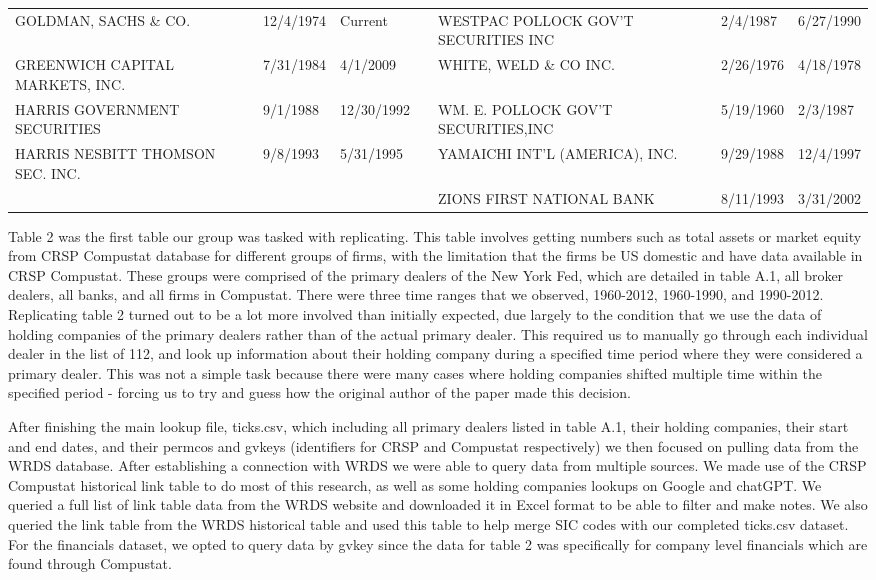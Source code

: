 \documentclass{article}
\begin{document}
\begin{tabular}{lllllll}
GOLDMAN, SACHS \& CO.                & 12/4/1974 & Current &  & WESTPAC POLLOCK GOV'T SECURITIES INC & 2/4/1987 & 6/27/1990 \\
GREENWICH CAPITAL MARKETS, INC.      & 7/31/1984 & 4/1/2009 &  & WHITE, WELD \& CO INC.                & 2/26/1976 & 4/18/1978 \\
HARRIS GOVERNMENT SECURITIES        & 9/1/1988 & 12/30/1992 &  & WM. E. POLLOCK GOV'T SECURITIES,INC  & 5/19/1960 & 2/3/1987 \\
HARRIS NESBITT THOMSON SEC. INC.    & 9/8/1993 & 5/31/1995 &  & YAMAICHI INT'L (AMERICA), INC.      & 9/29/1988 & 12/4/1997 \\
 &  &  &  & ZIONS FIRST NATIONAL BANK            & 8/11/1993 & 3/31/2002 \\
\bottomrule
\end{tabular}

\par

Table 2 was the first table our group was tasked with replicating. This table involves getting numbers such as total assets or market equity from CRSP Compustat database for different groups of firms, with the limitation that the firms be US domestic and have data available in CRSP Compustat. These groups were comprised of the primary dealers of the New York Fed, which are detailed in table A.1, all broker dealers, all banks, and all firms in Compustat. There were three time ranges that we observed, 1960-2012, 1960-1990, and 1990-2012. Replicating table 2 turned out to be a lot more involved than initially expected, due largely to the condition that we use the data of holding companies of the primary dealers rather than of the actual primary dealer. This required us to manually go through each individual dealer in the list of 112, and look up information about their holding company during a specified time period where they were considered a primary dealer. This was not a simple task because there were many cases where holding companies shifted multiple time within the specified period - forcing us to try and guess how the original author of the paper made this decision.

After finishing the main lookup file, ticks.csv, which including all primary dealers listed in table A.1, their holding companies, their start and end dates, and their permcos and gvkeys (identifiers for CRSP and Compustat respectively) we then focused on pulling data from the WRDS database. After establishing a connection with WRDS we were able to query data from multiple sources. We made use of the CRSP Compustat historical link table to do most of this research, as well as some holding companies lookups on Google and chatGPT. We queried a full list of link table data from the WRDS website and downloaded it in Excel format to be able to filter and make notes. We also queried the link table from the WRDS historical table and used this table to help merge SIC codes with our completed ticks.csv dataset. For the financials dataset, we opted to query data by gvkey since the data for table 2 was specifically for company level financials which are found through Compustat.
\end{document}
